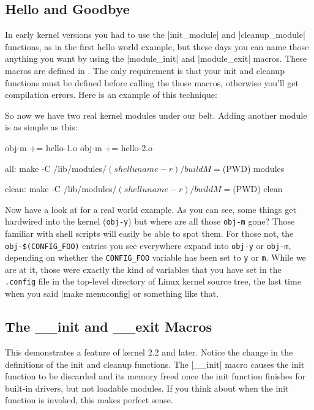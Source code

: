 \documentclass[10pt, oneside]{book}
\begin{document}
\subsection{Hello and Goodbye}
\label{hello_n_goodbye}
In early kernel versions you had to use the \cpp|init_module| and \cpp|cleanup_module| functions, as in the first hello world example, but these days you can name those anything you want by using the \cpp|module_init| and \cpp|module_exit| macros.
These macros are defined in .
The only requirement is that your init and cleanup functions must be defined before calling the those macros, otherwise you'll get compilation errors.
Here is an example of this technique:


So now we have two real kernel modules under our belt. Adding another module is as simple as this:

\begin{code}
obj-m += hello-1.o
obj-m += hello-2.o

all:
	make -C /lib/modules/$(shell uname -r)/build M=$(PWD) modules

clean:
	make -C /lib/modules/$(shell uname -r)/build M=$(PWD) clean
\end{code}

Now have a look at  for a real world example.
As you can see, some things get hardwired into the kernel (\verb|obj-y|) but where are all those \verb|obj-m| gone?
Those familiar with shell scripts will easily be able to spot them.
For those not, the \verb|obj-$(CONFIG_FOO)| entries you see everywhere expand into \verb|obj-y| or \verb|obj-m|, depending on whether the \verb|CONFIG_FOO| variable has been set to \verb|y| or \verb|m|.
While we are at it, those were exactly the kind of variables that you have set in the \verb|.config| file in the top-level directory of Linux kernel source tree, the last time when you said \sh|make menuconfig| or something like that.

\subsection{The \_\_init and \_\_exit Macros}
\label{init_n_exit}
This demonstrates a feature of kernel 2.2 and later.
Notice the change in the definitions of the init and cleanup functions.
The \cpp|__init| macro causes the init function to be discarded and its memory freed once the init function finishes for built-in drivers, but not loadable modules.
If you think about when the init function is invoked, this makes perfect sense.
\end{document}
